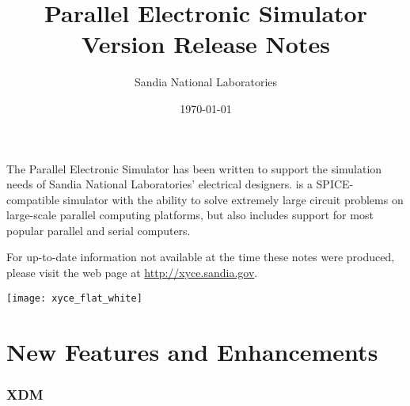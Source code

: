 \documentclass[letterpaper]{scrartcl}
\title{\XyceTitle{} Parallel Electronic Simulator\\
Version \XyceVersionVar{} Release Notes}
\author{ Sandia National Laboratories}
\date{\today}
\begin{document}
\maketitle


The \XyceTM{} Parallel Electronic Simulator has been written to support the
simulation needs of Sandia National Laboratories' electrical designers.
\XyceTM{} is a SPICE-compatible simulator with the ability to solve extremely
large circuit problems on large-scale parallel computing platforms, but also
includes support for most popular parallel and serial computers.

For up-to-date information not available at the time these notes were produced,
please visit the \XyceTM{} web page at
{\color{XyceDeepRed}\url{http://xyce.sandia.gov}}.

\tableofcontents
\vspace*{\fill}
\parbox{\textwidth}
{
  \hfill
  \texttt{[image: xyce\_flat\_white]}
}


\newpage
\section{New Features and Enhancements}

\subsubsection*{XDM}
\begin{XyceItemize}
\item 
\end{XyceItemize}
\end{document}
